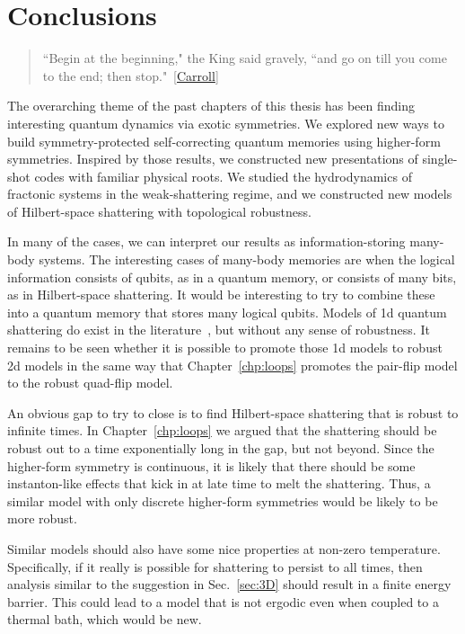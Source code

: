 
\chapter{Conclusions}
\label{chp:conclusion}

\begin{quotation}
	 ``Begin at the beginning," the King said gravely, ``and go on till you come to the end; then stop."~[\hyperlink{cite.\therefsection @Carroll2002Alice}{Carroll}]
\end{quotation}

The overarching theme of the past chapters of this thesis has been finding interesting quantum dynamics via exotic symmetries. We explored new ways to build symmetry-protected self-correcting quantum memories using higher-form symmetries. Inspired by those results, we constructed new presentations of single-shot codes with familiar physical roots. We studied the hydrodynamics of fractonic systems in the weak-shattering regime, and we constructed new models of Hilbert-space shattering with topological robustness.

In many of the cases, we can interpret our results as information-storing many-body systems.
The interesting cases of many-body memories are when the logical information consists of qubits, as in a quantum memory, or consists of many bits, as in Hilbert-space shattering. It would be interesting to try to combine these into a quantum memory that stores many logical qubits. Models of 1d quantum shattering do exist in the literature~\cite{Moudgalya2022Commutant}, but without any sense of robustness. It remains to be seen whether it is possible to promote those 1d models to robust 2d models in the same way that Chapter~\ref{chp:loops} promotes the pair-flip model to the robust quad-flip model.

An obvious gap to try to close is to find Hilbert-space shattering that is robust to infinite times. In Chapter~\ref{chp:loops} we argued that the shattering should be robust out to a time exponentially long in the gap, but not beyond. Since the higher-form symmetry is continuous, it is likely that there should be some instanton-like effects that kick in at late time to melt the shattering. Thus, a similar model with only discrete higher-form symmetries would be likely to be more robust.

Similar models should also have some nice properties at non-zero temperature. Specifically, if it really is possible for shattering to persist to all times, then analysis similar to the suggestion in Sec.~\ref{sec:3D} should result in a finite energy barrier. This could lead to a model that is not ergodic even when coupled to a thermal bath, which would be new.

